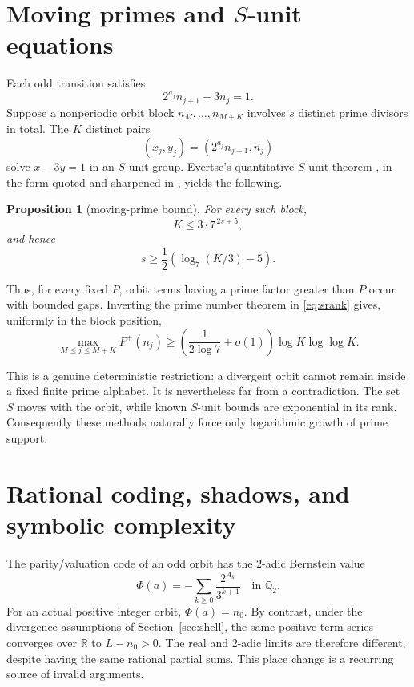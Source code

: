 \documentclass[11pt,reqno]{amsart}
\theoremstyle{plain}
\newtheorem{proposition}[theorem]{Proposition}
\theoremstyle{definition}
\numberwithin{equation}{section}
\newcommand{\R}{\mathbb{R}}
\newcommand{\Qp}[1]{\mathbb{Q}_{#1}}
\begin{document}
\section{Moving primes and \texorpdfstring{$S$}{S}-unit equations}
\label{sec:sunit}

Each odd transition satisfies
\begin{equation}\label{eq:transition}
2^{a_j}n_{j+1}-3n_j=1.
\end{equation}
Suppose a nonperiodic orbit block $n_M,\ldots,n_{M+K}$ involves $s$ distinct
prime divisors in total.  The $K$ distinct pairs
\[
(x_j,y_j)=(2^{a_j}n_{j+1},n_j)
\]
solve $x-3y=1$ in an $S$-unit group.  Evertse's quantitative $S$-unit theorem
\cite{evertse1984}, in the form quoted and sharpened in
\cite{beukersschlickewei1996}, yields the following.

\begin{proposition}[moving-prime bound]
\label{prop:movingprime}
For every such block,
\[
K\le3\cdot7^{\,2s+5},
\]
and hence
\begin{equation}\label{eq:srank}
s\ge\frac12\left(\log_7(K/3)-5\right).
\end{equation}
\end{proposition}

Thus, for every fixed $P$, orbit terms having a prime factor greater than $P$
occur with bounded gaps.  Inverting the prime number theorem in
\eqref{eq:srank} gives, uniformly in the block position,
\begin{equation}\label{eq:primegrowth}
\max_{M\le j\le M+K}P^+(n_j)
\ge
\left(\frac1{2\log7}+o(1)\right)
\log K\log\log K.
\end{equation}

This is a genuine deterministic restriction: a divergent orbit cannot remain
inside a fixed finite prime alphabet.  It is nevertheless far from a
contradiction.  The set $S$ moves with the orbit, while known $S$-unit bounds
are exponential in its rank.  Consequently these methods naturally force
only logarithmic growth of prime support.

\section{Rational coding, shadows, and symbolic complexity}
\label{sec:coding}

The parity/valuation code of an odd orbit has the $2$-adic Bernstein value
\begin{equation}\label{eq:bernstein}
\Phi(a)
=-\sum_{k\ge0}\frac{2^{A_k}}{3^{k+1}}
\quad\text{in }\Qp{2}.
\end{equation}
For an actual positive integer orbit, $\Phi(a)=n_0$.  By contrast, under the
divergence assumptions of Section~\ref{sec:shell}, the same positive-term
series converges over $\R$ to $L-n_0>0$.  The real and $2$-adic limits are
therefore different, despite having the same rational partial sums.  This
place change is a recurring source of invalid arguments.
\end{document}
